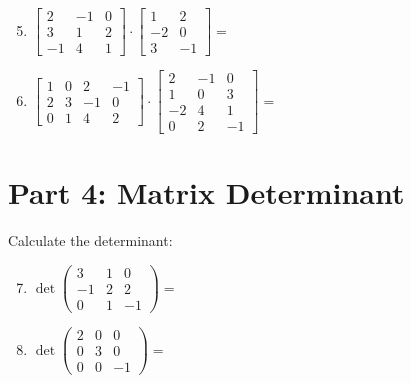 \documentclass{article}
\begin{document}
\begin{enumerate}
	\setcounter{enumi}{4}
	\item $\begin{bmatrix} 2 & -1 & 0 \\ 3 & 1 & 2 \\ -1 & 4 & 1 \end{bmatrix} \cdot \begin{bmatrix} 1 & 2 \\ -2 & 0 \\ 3 & -1 \end{bmatrix} = $ \underline{\hspace{3cm}}
	
	\item $\begin{bmatrix} 1 & 0 & 2 & -1 \\ 2 & 3 & -1 & 0 \\ 0 & 1 & 4 & 2 \end{bmatrix} \cdot \begin{bmatrix} 2 & -1 & 0 \\ 1 & 0 & 3 \\ -2 & 4 & 1 \\ 0 & 2 & -1 \end{bmatrix} = $ \underline{\hspace{3cm}}
\end{enumerate}

\section*{Part 4: Matrix Determinant}
Calculate the determinant:

\begin{enumerate}
	\setcounter{enumi}{6}
	\item $\det\begin{pmatrix} 3 & 1 & 0 \\ -1 & 2 & 2 \\ 0 & 1 & -1 \end{pmatrix} = $ \underline{\hspace{3cm}}
	
	\item $\det\begin{pmatrix} 2 & 0 & 0 \\ 0 & 3 & 0 \\ 0 & 0 & -1  \end{pmatrix} = $ \underline{\hspace{3cm}}
\end{enumerate}
\end{document}
